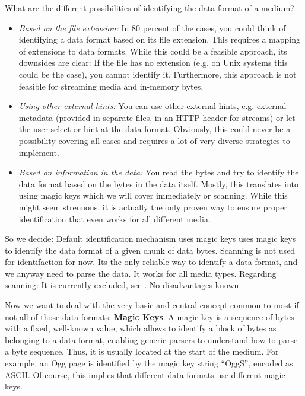What are the different possibilities of identifying the data format of a medium?
\begin{itemize}
\item \emph{Based on the file extension:} In 80 percent of the cases, you could think of identifying a data format based on its file extension. This requires a mapping of extensions to data formats. While this could be a feasible approach, its downsides are clear: If the file has no extension (e.g. on Unix systems this could be the case), you cannot identify it. Furthermore, this approach is not feasible for streaming media and in-memory bytes.
\item \emph{Using other external hints:} You can use other external hints, e.g. external metadata (provided in separate files, in an HTTP header for streams) or let the user select or hint at the data format. Obviously, this could never be a possibility covering all cases and requires a lot of very diverse strategies to implement. 
\item \emph{Based on information in the data:} You read the bytes and try to identify the data format based on the bytes in the data itself. Mostly, this translates into using magic keys which we will cover immediately or scanning. While this might seem strenuous, it is actually the only proven way to ensure proper identification that even works for all different media.
\end{itemize}

So we decide:
{%
Default identification mechanism uses magic keys
}
{%
\LibName{} uses magic keys to identify the data format of a given chunk of data bytes. Scanning is not used for identifaction for now.
}
{%
Its the only reliable way to identify a data format, and we anyway need to parse the data. It works for all media types. Regarding scanning:  It is currently excluded, see .
}
{%
No disadvantages known
}

Now we want to deal with the very basic and central concept common to most if not all of those data formats: \textbf{Magic Keys}. A magic key is a sequence of bytes with a fixed, well-known value, which allows to identify a block of bytes as belonging to a data format, enabling generic parsers to understand how to parse a byte sequence. Thus, it is usually located at the start of the medium. For example, an Ogg page is identified by the magic key string ``OggS'', encoded as ASCII. Of course, this implies that different data formats use different magic keys.

